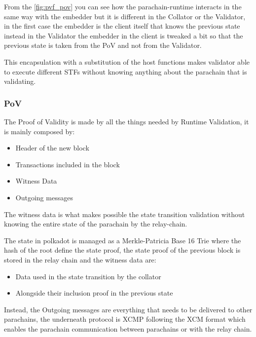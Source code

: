 \documentclass[../main.tex]{subfiles}
\begin{document}

From the \ref{fig:pvf_pov} you can see how the parachain-runtime interacts in the same way with the embedder but it is different in the Collator or the Validator, in the first case the embedder is the client itself that knows the previous state instead in the Validator the embedder in the client is tweaked a bit so that the previous state is taken from the PoV and not from the Validator.

This encapsulation with a substitution of the host functions makes  validator able to execute different STFs without knowing anything about the parachain that is validating.

\subsubsection{PoV}

The Proof of Validity is made by all the things needed by Runtime Validation, it is mainly composed by:~\cite{cumulus-docs}

\begin{itemize}
  \item Header of the new block
  \item Transactions included in the block
  \item Witness Data
  \item Outgoing messages
\end{itemize}

The witness data is what makes possible the state transition validation without knowing the entire state of the parachain by the relay-chain.

The state in polkadot is managed as a Merkle-Patricia Base 16 Trie where the hash of the root define the state proof, the state proof of the previous block is stored in the relay chain and the witness data are:


\begin{itemize}
  \item Data used in the state transition by the collator
  \item Alongside their inclusion proof in the previous state
\end{itemize}

Instead, the Outgoing messages are everything that needs to be delivered to other parachains, the underneath protocol is XCMP following the XCM format which enables the parachain communication between parachains or with the relay chain.
\end{document}
